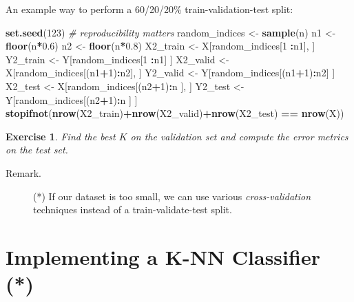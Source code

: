\documentclass[10pt,b5paper,krantz1]{krantz}
\newenvironment{Shaded}{\begin{snugshade}}{\end{snugshade}}
\newcommand{\CommentTok}[1]{\textcolor[rgb]{0.37,0.37,0.37}{\textit{#1}}}
\newcommand{\DecValTok}[1]{\textcolor[rgb]{0.06,0.06,0.06}{#1}}
\newcommand{\FloatTok}[1]{\textcolor[rgb]{0.06,0.06,0.06}{#1}}
\newcommand{\KeywordTok}[1]{\textcolor[rgb]{0.27,0.27,0.27}{\textbf{#1}}}
\newcommand{\NormalTok}[1]{#1}
\newcommand{\OperatorTok}[1]{\textcolor[rgb]{0.43,0.43,0.43}{\textbf{#1}}}
\newcommand{\StringTok}[1]{\textcolor[rgb]{0.5,0.5,0.5}{#1}}
\newtheorem{exercise}{Exercise}[chapter]
\begin{document}
An example way to perform a 60/20/20\% train-validation-test split:

\begin{Shaded}
\begin{Highlighting}[]
\KeywordTok{set.seed}\NormalTok{(}\DecValTok{123}\NormalTok{) }\CommentTok{# reproducibility matters}
\NormalTok{random_indices <-}\StringTok{ }\KeywordTok{sample}\NormalTok{(n)}
\NormalTok{n1 <-}\StringTok{ }\KeywordTok{floor}\NormalTok{(n}\OperatorTok{*}\FloatTok{0.6}\NormalTok{)}
\NormalTok{n2 <-}\StringTok{ }\KeywordTok{floor}\NormalTok{(n}\OperatorTok{*}\FloatTok{0.8}\NormalTok{)}
\NormalTok{X2_train <-}\StringTok{ }\NormalTok{X[random_indices[}\DecValTok{1}     \OperatorTok{:}\NormalTok{n1], ]}
\NormalTok{Y2_train <-}\StringTok{ }\NormalTok{Y[random_indices[}\DecValTok{1}     \OperatorTok{:}\NormalTok{n1]  ]}
\NormalTok{X2_valid <-}\StringTok{ }\NormalTok{X[random_indices[(n1}\OperatorTok{+}\DecValTok{1}\NormalTok{)}\OperatorTok{:}\NormalTok{n2], ]}
\NormalTok{Y2_valid <-}\StringTok{ }\NormalTok{Y[random_indices[(n1}\OperatorTok{+}\DecValTok{1}\NormalTok{)}\OperatorTok{:}\NormalTok{n2]  ]}
\NormalTok{X2_test  <-}\StringTok{ }\NormalTok{X[random_indices[(n2}\OperatorTok{+}\DecValTok{1}\NormalTok{)}\OperatorTok{:}\NormalTok{n ], ]}
\NormalTok{Y2_test  <-}\StringTok{ }\NormalTok{Y[random_indices[(n2}\OperatorTok{+}\DecValTok{1}\NormalTok{)}\OperatorTok{:}\NormalTok{n ]  ]}
\KeywordTok{stopifnot}\NormalTok{(}\KeywordTok{nrow}\NormalTok{(X2_train)}\OperatorTok{+}\KeywordTok{nrow}\NormalTok{(X2_valid)}\OperatorTok{+}\KeywordTok{nrow}\NormalTok{(X2_test)}
    \OperatorTok{==}\StringTok{ }\KeywordTok{nrow}\NormalTok{(X))}
\end{Highlighting}
\end{Shaded}

\begin{exercise}

Find the best \(K\) on the validation set and compute the error metrics
on the test set.

\end{exercise}

\begin{description}
\item[Remark.]
(*) If our dataset is too small,
we can use various \emph{cross-validation} techniques
instead of a train-validate-test split.
\end{description}

\hypertarget{implementing-a-k-nn-classifier}{%
\section{Implementing a K-NN Classifier (*)}\label{implementing-a-k-nn-classifier}}
\end{document}
